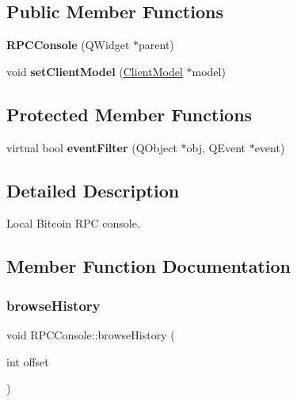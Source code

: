 \subsection*{Public Member Functions}
\begin{DoxyCompactItemize}
\item 
\mbox{\label{class_r_p_c_console_aeac546e68f8c2cafa79a0294dd78f2ad}} 
{\bfseries R\+P\+C\+Console} (Q\+Widget $\ast$parent)
\item 
\mbox{\label{class_r_p_c_console_a355349a33664a07628e9ca22a60f5fa7}} 
void {\bfseries set\+Client\+Model} (\mbox{\hyperlink{class_client_model}{Client\+Model}} $\ast$model)
\end{DoxyCompactItemize}
\subsection*{Protected Member Functions}
\begin{DoxyCompactItemize}
\item 
\mbox{\label{class_r_p_c_console_a81ce4c9d95e3de6de4c46ec272ae91ba}} 
virtual bool {\bfseries event\+Filter} (Q\+Object $\ast$obj, Q\+Event $\ast$event)
\end{DoxyCompactItemize}


\subsection{Detailed Description}
Local Bitcoin R\+PC console. 

\subsection{Member Function Documentation}
\mbox{\label{class_r_p_c_console_a1c2ccbaedfeb8ed8cd3f73307a38bd7f}} 
\subsubsection{\texorpdfstring{browseHistory}{browseHistory}}
{\footnotesize\ttfamily void R\+P\+C\+Console\+::browse\+History (\begin{DoxyParamCaption}\item[{int}]{offset }\end{DoxyParamCaption})\hspace{0.3cm}{\ttfamily [slot]}}

